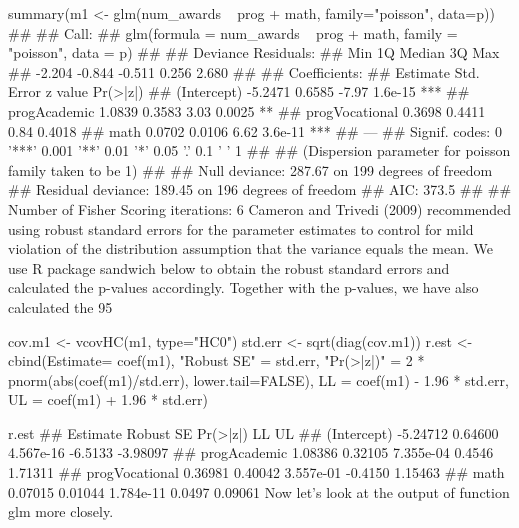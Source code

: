 summary(m1 <- glm(num_awards ~ prog + math, family="poisson", data=p))
## 
## Call:
## glm(formula = num_awards ~ prog + math, family = "poisson", data = p)
## 
## Deviance Residuals: 
##    Min      1Q  Median      3Q     Max  
## -2.204  -0.844  -0.511   0.256   2.680  
## 
## Coefficients:
##                Estimate Std. Error z value Pr(>|z|)    
## (Intercept)     -5.2471     0.6585   -7.97  1.6e-15 ***
## progAcademic     1.0839     0.3583    3.03   0.0025 ** 
## progVocational   0.3698     0.4411    0.84   0.4018    
## math             0.0702     0.0106    6.62  3.6e-11 ***
## ---
## Signif. codes:  0 '***' 0.001 '**' 0.01 '*' 0.05 '.' 0.1 ' ' 1
## 
## (Dispersion parameter for poisson family taken to be 1)
## 
##     Null deviance: 287.67  on 199  degrees of freedom
## Residual deviance: 189.45  on 196  degrees of freedom
## AIC: 373.5
## 
## Number of Fisher Scoring iterations: 6
Cameron and Trivedi (2009) recommended using robust standard errors for the parameter estimates to control for mild violation of the distribution assumption that the variance equals the mean. We use R package sandwich below to obtain the robust standard errors and calculated the p-values accordingly. Together with the p-values, we have also calculated the 95%

cov.m1 <- vcovHC(m1, type="HC0")
std.err <- sqrt(diag(cov.m1))
r.est <- cbind(Estimate= coef(m1), "Robust SE" = std.err,
"Pr(>|z|)" = 2 * pnorm(abs(coef(m1)/std.err), lower.tail=FALSE),
LL = coef(m1) - 1.96 * std.err,
UL = coef(m1) + 1.96 * std.err)

r.est
##                Estimate Robust SE  Pr(>|z|)      LL       UL
## (Intercept)    -5.24712   0.64600 4.567e-16 -6.5133 -3.98097
## progAcademic    1.08386   0.32105 7.355e-04  0.4546  1.71311
## progVocational  0.36981   0.40042 3.557e-01 -0.4150  1.15463
## math            0.07015   0.01044 1.784e-11  0.0497  0.09061
Now let's look at the output of function glm more closely.


